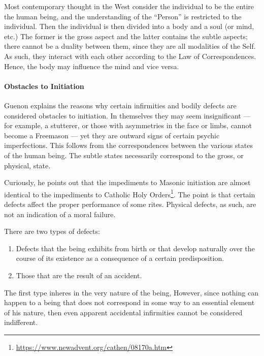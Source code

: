 Most contemporary thought in the West consider the individual to be the entire the human being, and the understanding of the ``Person'' is restricted to the individual. Then the individual is then divided into a body and a soul (or mind, etc.) The former is the gross aspect and the latter contains the subtle aspects; there cannot be a duality between them, since they are all modalities of the Self. As such, they interact with each other according to the Law of Correspondences. Hence, the body may influence the mind and vice versa.

\paragraph{Obstacles to Initiation}


Guenon explains the reasons why certain infirmities and bodily defects are considered obstacles to initiation. In themselves they may seem insignificant --- for example, a stutterer, or those with asymmetries in the face or limbs, cannot become a Freemason --- yet they are outward signs of certain psychic imperfections. This follows from the correspondences between the various states of the human being. The subtle states necessarily correspond to the gross, or physical, state.

Curiously, he points out that the impediments to Masonic initiation are almost identical to the impediments to Catholic Holy Orders\footnote{\url{https://www.newadvent.org/cathen/08170a.htm}}. The point is that certain defects affect the proper performance of some rites. Physical defects, as such, are not an indication of a moral failure.

There are two types of defects:

\begin{enumerate}


\item Defects that the being exhibits from birth or that develop naturally over the course of its existence as a consequence of a certain predisposition.

\item Those that are the result of an accident.
\end{enumerate}


The first type inheres in the very nature of the being, However, since nothing can happen to a being that does not correspond in some way to an essential element of his nature, then even apparent accidental infirmities cannot be considered indifferent.

